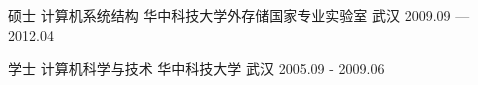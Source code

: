 


\begin{cventries}

  \cventry
    {硕士   计算机系统结构} %
    {华中科技大学外存储国家专业实验室} %
    {武汉} %
    {2009.09 — 2012.04} %
    {}

  \cventry
    {学士   计算机科学与技术} %
    {华中科技大学} %
    {武汉} %
    {2005.09 - 2009.06} %
    {}

\end{cventries}
